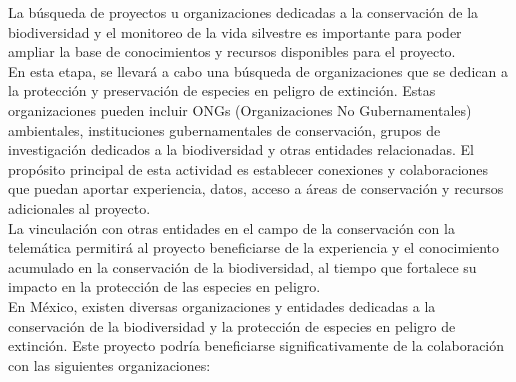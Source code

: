 La búsqueda de proyectos u organizaciones dedicadas a la conservación de la biodiversidad y el monitoreo de la vida silvestre es importante para poder ampliar la base de conocimientos y recursos disponibles para el proyecto.\\
En esta etapa, se llevará a cabo una búsqueda de organizaciones que se dedican a la protección y preservación de especies en peligro de extinción. Estas organizaciones pueden incluir ONGs (Organizaciones No Gubernamentales) ambientales, instituciones gubernamentales de conservación, grupos de investigación dedicados a la biodiversidad y otras entidades relacionadas. El propósito principal de esta actividad es establecer conexiones y colaboraciones que puedan aportar experiencia, datos, acceso a áreas de conservación y recursos adicionales al proyecto.\\
La vinculación con otras entidades en el campo de la conservación con la telemática permitirá al proyecto beneficiarse de la experiencia y el conocimiento acumulado en la conservación de la biodiversidad, al tiempo que fortalece su impacto en la protección de las especies en peligro.\\
En México, existen diversas organizaciones y entidades dedicadas a la conservación de la biodiversidad y la protección de especies en peligro de extinción. Este proyecto podría beneficiarse significativamente de la colaboración con las siguientes organizaciones:

